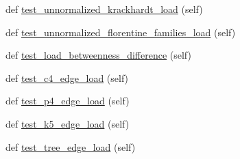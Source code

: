 \begin{DoxyCompactItemize}
\item 
def \hyperlink{classnetworkx_1_1algorithms_1_1centrality_1_1tests_1_1test__load__centrality_1_1TestLoadCentrality_ac30c5a532ddfdec0ee65c3e2c51a66fe}{test\+\_\+unnormalized\+\_\+krackhardt\+\_\+load} (self)
\item 
def \hyperlink{classnetworkx_1_1algorithms_1_1centrality_1_1tests_1_1test__load__centrality_1_1TestLoadCentrality_a39a643935332e44242c16e78573124f8}{test\+\_\+unnormalized\+\_\+florentine\+\_\+families\+\_\+load} (self)
\item 
def \hyperlink{classnetworkx_1_1algorithms_1_1centrality_1_1tests_1_1test__load__centrality_1_1TestLoadCentrality_a1d68fbfbce84642f7569fb6395741f58}{test\+\_\+load\+\_\+betweenness\+\_\+difference} (self)
\item 
def \hyperlink{classnetworkx_1_1algorithms_1_1centrality_1_1tests_1_1test__load__centrality_1_1TestLoadCentrality_a377f8029f897b3db5f02f4a5d06591b1}{test\+\_\+c4\+\_\+edge\+\_\+load} (self)
\item 
def \hyperlink{classnetworkx_1_1algorithms_1_1centrality_1_1tests_1_1test__load__centrality_1_1TestLoadCentrality_a682f7255f8f864eb43417511167e7ff3}{test\+\_\+p4\+\_\+edge\+\_\+load} (self)
\item 
def \hyperlink{classnetworkx_1_1algorithms_1_1centrality_1_1tests_1_1test__load__centrality_1_1TestLoadCentrality_a6741e4e75961eff7bcb518b9b5ff3b78}{test\+\_\+k5\+\_\+edge\+\_\+load} (self)
\item 
def \hyperlink{classnetworkx_1_1algorithms_1_1centrality_1_1tests_1_1test__load__centrality_1_1TestLoadCentrality_a3165471886214df96755eb7bcc4c829e}{test\+\_\+tree\+\_\+edge\+\_\+load} (self)
\end{DoxyCompactItemize}
